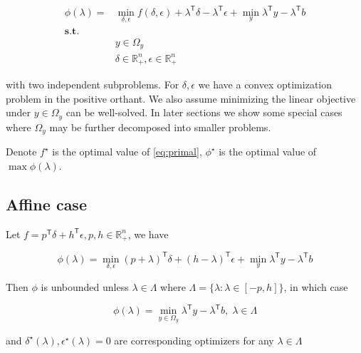 \documentclass[../main]{subfiles}
\begin{document}
\begin{equation}\label{eq:dual}
  \begin{aligned}
    \phi(\lambda) = & \min_{\delta, \epsilon} f(\delta, \epsilon) + \lambda^\mathsf{T}\delta - \lambda^\mathsf{T} \epsilon+ \min_y \lambda^\mathsf{T} y - \lambda^\mathsf{T} b \\
    \mathbf{s.t.}   &                                                                                                                                                          \\
                    & y \in \Omega_y                                                                                                                                           \\
                    & \delta \in \mathbb{R}^n_+ , \epsilon \in \mathbb{R}^n_+
  \end{aligned}
\end{equation}

with two independent subproblems.
For \(\delta, \epsilon\) we have a convex optimization problem in the positive orthant.
We also assume minimizing the linear objective under \(y\in \Omega_y\) can be well-solved.
In later sections we show some special cases where \(\Omega_y\) may be further decomposed into smaller problems.

Denote \(f^\star\) is the optimal value of \eqref{eq:primal}, \(\phi^\star\) is the optimal value of \(\max \phi(\lambda)\).

\subsection{Affine case}\label{affine-case}

Let \(f=p^\mathsf{T}\delta + h^\mathsf{T} \epsilon, p, h \in \mathbb R_+^n\), we have

\begin{equation}\label{eq:def_affine}
  \phi(\lambda) = \min_{\delta, \epsilon} (p+ \lambda)^\mathsf{T}\delta + (h - \lambda)^\mathsf{T} \epsilon+ \min_y \lambda^\mathsf{T} y - \lambda^\mathsf{T} b
\end{equation}

Then \(\phi\) is unbounded unless \(\lambda \in \Lambda\) where
\(\Lambda = \{\lambda: \lambda \in [-p, h]\}\), in which case

\[\phi(\lambda) = \min_{y\in \Omega_y} \lambda^\mathsf{T} y - \lambda^\mathsf{T} b,\; \lambda\in \Lambda\]

and \(\delta^\star(\lambda), \epsilon^\star(\lambda)= 0\) are corresponding optimizers
for any \(\lambda \in \Lambda\)
\end{document}

